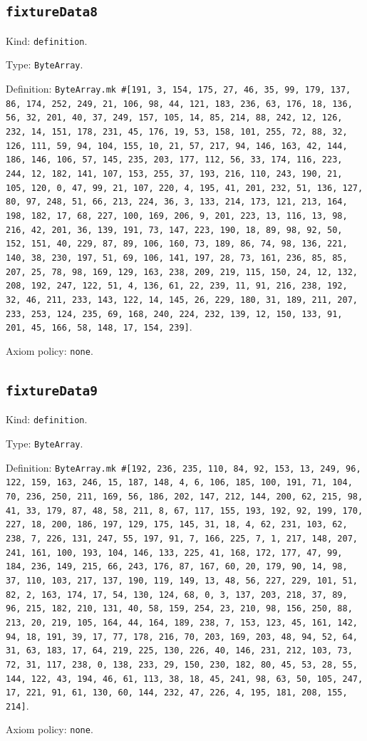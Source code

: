 \documentclass[11pt]{article}
\begin{document}
\subsection*{\texttt{fixtureData8}}
\noindent Kind: \texttt{definition}.\par
\noindent Type: \texttt{ByteArray}.\par
\noindent Definition: \texttt{ByteArray.mk \#[191, 3, 154, 175, 27, 46, 35, 99, 179, 137, 86, 174, 252, 249, 21, 106, 98, 44, 121, 183, 236, 63, 176, 18, 136, 56, 32, 201, 40, 37, 249, 157, 105, 14, 85, 214, 88, 242, 12, 126, 232, 14, 151, 178, 231, 45, 176, 19, 53, 158, 101, 255, 72, 88, 32, 126, 111, 59, 94, 104, 155, 10, 21, 57, 217, 94, 146, 163, 42, 144, 186, 146, 106, 57, 145, 235, 203, 177, 112, 56, 33, 174, 116, 223, 244, 12, 182, 141, 107, 153, 255, 37, 193, 216, 110, 243, 190, 21, 105, 120, 0, 47, 99, 21, 107, 220, 4, 195, 41, 201, 232, 51, 136, 127, 80, 97, 248, 51, 66, 213, 224, 36, 3, 133, 214, 173, 121, 213, 164, 198, 182, 17, 68, 227, 100, 169, 206, 9, 201, 223, 13, 116, 13, 98, 216, 42, 201, 36, 139, 191, 73, 147, 223, 190, 18, 89, 98, 92, 50, 152, 151, 40, 229, 87, 89, 106, 160, 73, 189, 86, 74, 98, 136, 221, 140, 38, 230, 197, 51, 69, 106, 141, 197, 28, 73, 161, 236, 85, 85, 207, 25, 78, 98, 169, 129, 163, 238, 209, 219, 115, 150, 24, 12, 132, 208, 192, 247, 122, 51, 4, 136, 61, 22, 239, 11, 91, 216, 238, 192, 32, 46, 211, 233, 143, 122, 14, 145, 26, 229, 180, 31, 189, 211, 207, 233, 253, 124, 235, 69, 168, 240, 224, 232, 139, 12, 150, 133, 91, 201, 45, 166, 58, 148, 17, 154, 239]}.\par
\noindent Axiom policy: \texttt{none}.\par
\subsection*{\texttt{fixtureData9}}
\noindent Kind: \texttt{definition}.\par
\noindent Type: \texttt{ByteArray}.\par
\noindent Definition: \texttt{ByteArray.mk \#[192, 236, 235, 110, 84, 92, 153, 13, 249, 96, 122, 159, 163, 246, 15, 187, 148, 4, 6, 106, 185, 100, 191, 71, 104, 70, 236, 250, 211, 169, 56, 186, 202, 147, 212, 144, 200, 62, 215, 98, 41, 33, 179, 87, 48, 58, 211, 8, 67, 117, 155, 193, 192, 92, 199, 170, 227, 18, 200, 186, 197, 129, 175, 145, 31, 18, 4, 62, 231, 103, 62, 238, 7, 226, 131, 247, 55, 197, 91, 7, 166, 225, 7, 1, 217, 148, 207, 241, 161, 100, 193, 104, 146, 133, 225, 41, 168, 172, 177, 47, 99, 184, 236, 149, 215, 66, 243, 176, 87, 167, 60, 20, 179, 90, 14, 98, 37, 110, 103, 217, 137, 190, 119, 149, 13, 48, 56, 227, 229, 101, 51, 82, 2, 163, 174, 17, 54, 130, 124, 68, 0, 3, 137, 203, 218, 37, 89, 96, 215, 182, 210, 131, 40, 58, 159, 254, 23, 210, 98, 156, 250, 88, 213, 20, 219, 105, 164, 44, 164, 189, 238, 7, 153, 123, 45, 161, 142, 94, 18, 191, 39, 17, 77, 178, 216, 70, 203, 169, 203, 48, 94, 52, 64, 31, 63, 183, 17, 64, 219, 225, 130, 226, 40, 146, 231, 212, 103, 73, 72, 31, 117, 238, 0, 138, 233, 29, 150, 230, 182, 80, 45, 53, 28, 55, 144, 122, 43, 194, 46, 61, 113, 38, 18, 45, 241, 98, 63, 50, 105, 247, 17, 221, 91, 61, 130, 60, 144, 232, 47, 226, 4, 195, 181, 208, 155, 214]}.\par
\noindent Axiom policy: \texttt{none}.\par
\end{document}

